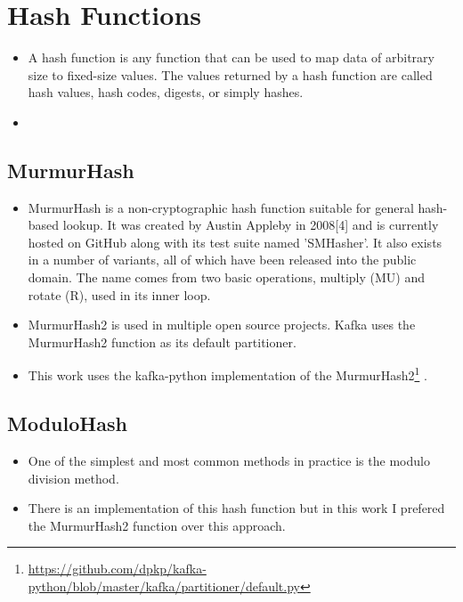 \section{Hash Functions}
\label{sec:hash-functions}
\begin{itemize}
    \item A hash function is any function that can be used to map data of arbitrary size to fixed-size values. The values returned by a hash function are called hash values, hash codes, digests, or simply hashes.
    \item 
\end{itemize}


\subsection{MurmurHash}
\label{subsec:murmurhash}
\begin{itemize}
    \item MurmurHash is a non-cryptographic hash function suitable for general hash-based lookup. It was created by Austin Appleby in 2008[4] and is currently hosted on GitHub along with its test suite named 'SMHasher'. It also exists in a number of variants, all of which have been released into the public domain. The name comes from two basic operations, multiply (MU) and rotate (R), used in its inner loop.
    \item MurmurHash2 is used in multiple open source projects. Kafka uses the MurmurHash2 function as its default partitioner.
    \item This work uses the kafka-python implementation of the MurmurHash2\footnote{\url{https://github.com/dpkp/kafka-python/blob/master/kafka/partitioner/default.py}} .
\end{itemize}


\subsection{ModuloHash}
\begin{itemize}
    \item One of the simplest and most common methods in practice is the modulo division method.
    \item There is an implementation of this hash function but in this work I prefered the MurmurHash2 function over this approach.
\end{itemize}
